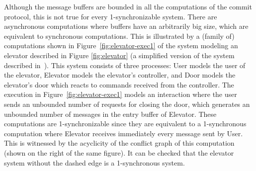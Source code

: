Although the message buffers are bounded in all the computations of the commit protocol, this is not true for every 1-synchronizable system.
There are asynchronous computations where buffers have an arbitrarily big size, which are equivalent to synchronous computations. This is illustrated by a (family of) computations shown in Figure~\ref{fig:elevator-exec1} of the system modeling an elevator described in Figure \ref{fig:elevator} (a simplified version of the system described in~\cite{DBLP:conf/pldi/DesaiGJQRZ13}). This system consists of three processes: {\sf User} models the user of the elevator, {\sf Elevator} models the elevator's controller, and {\sf Door} models the elevator's door which reacts to commands received from the controller. 
The execution in Figure~\ref{fig:elevator-exec1} models an interaction where the user sends an unbounded number of requests for closing the door, which generates an unbounded number of messages in the entry buffer of {\sf Elevator}. These computations are 1-synchronizable since they are equivalent to a 1-synchronous computation where {\sf Elevator} receives immediately every message sent by {\sf User}. This is witnessed by the acyclicity of the conflict graph of this computation (shown on the right of the same figure). It can be checked that the elevator system without the dashed edge is a 1-synchronous system. 

